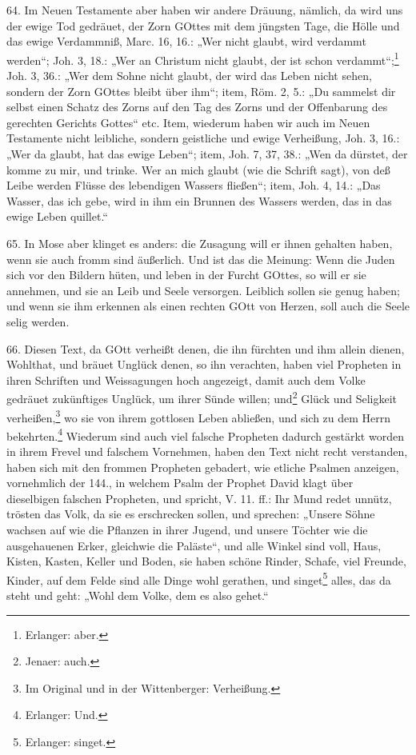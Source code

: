 64. Im Neuen Testamente aber haben wir andere Dräuung, nämlich, da wird uns der ewige Tod gedräuet, der Zorn GOttes mit dem jüngsten Tage, die Hölle und das ewige Verdammniß, Marc. 16, 16.: „Wer nicht glaubt, wird verdammt werden“; Joh. 3, 18.: „Wer an Christum nicht glaubt, der ist schon verdammt“;\footnote{Erlanger: aber.} Joh. 3, 36.: „Wer dem Sohne nicht glaubt, der wird das Leben nicht sehen, sondern der Zorn GOttes bleibt über ihm“; item, Röm. 2, 5.: „Du sammelst dir selbst einen Schatz des Zorns auf den Tag des Zorns und der Offenbarung des gerechten Gerichts Gottes“ etc. Item, wiederum haben wir auch im Neuen Testamente nicht leibliche, sondern geistliche und ewige Verheißung, Joh. 3, 16.: „Wer da glaubt, hat das ewige Leben“; item, Joh. 7, 37, 38.: „Wen da dürstet, der komme zu mir, und trinke. Wer an mich glaubt (wie die Schrift sagt), von deß Leibe werden Flüsse des lebendigen Wassers fließen“; item, Joh. 4, 14.: „Das Wasser, das ich gebe, wird in ihm ein Brunnen des Wassers werden, das in das ewige Leben quillet.“

65. In Mose aber klinget es anders: die Zusagung will er ihnen gehalten haben, wenn sie auch fromm sind äußerlich. Und ist das die Meinung: Wenn die Juden sich vor den Bildern hüten, und leben in der Furcht GOttes, so will er sie annehmen, und sie an Leib und Seele versorgen. Leiblich sollen sie genug haben; und wenn sie ihm erkennen als einen rechten GOtt von Herzen, soll auch die Seele selig werden.

66. Diesen Text, da GOtt verheißt denen,
die ihn fürchten und ihm allein dienen, Wohlthat, und bräuet Unglück denen, so ihn verachten, haben viel Propheten in ihren Schriften und Weissagungen hoch angezeigt, damit auch dem Volke gedräuet zukünftiges Unglück, um ihrer Sünde willen; und\footnote{Jenaer: auch.} Glück und Seligkeit verheißen,\footnote{Im Original und in der Wittenberger: Verheißung.} wo sie von ihrem gottlosen Leben abließen, und sich zu dem Herrn bekehrten.\footnote{Erlanger: Und.} Wiederum sind auch viel falsche Propheten dadurch gestärkt worden in ihrem Frevel und falschem Vornehmen, haben den Text nicht recht verstanden, haben sich mit den frommen Propheten gebadert, wie etliche Psalmen anzeigen, vornehmlich der 144., in welchem Psalm der Prophet David klagt über dieselbigen falschen Propheten, und spricht, V. 11. ff.: Ihr Mund redet unnütz, trösten das Volk, da sie es erschrecken sollen, und sprechen: „Unsere Söhne wachsen auf wie die Pflanzen in ihrer Jugend, und unsere Töchter wie die ausgehauenen Erker, gleichwie die Paläste“, und alle Winkel sind voll, Haus, Kisten, Kasten, Keller und Boden, sie haben schöne Rinder, Schafe, viel Freunde, Kinder, auf dem Felde sind alle Dinge wohl gerathen, und singet\footnote{Erlanger: singet.} alles, das da steht und geht: „Wohl dem Volke, dem es also gehet.“

